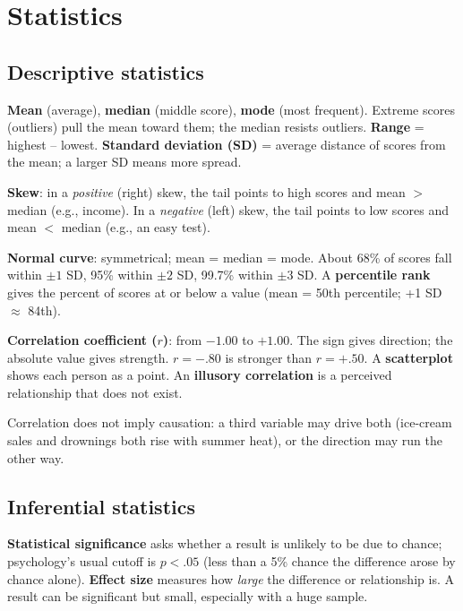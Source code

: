 \documentclass[11pt]{article}
\begin{document}
\section{Statistics}

\subsection{Descriptive statistics}
\textbf{Mean} (average), \textbf{median} (middle score), \textbf{mode} (most frequent). Extreme scores (outliers) pull the mean toward them; the median resists outliers.
\textbf{Range} = highest -- lowest. \textbf{Standard deviation (SD)} = average distance of scores from the mean; a larger SD means more spread.

\textbf{Skew}: in a \emph{positive} (right) skew, the tail points to high scores and mean \(>\) median (e.g., income). In a \emph{negative} (left) skew, the tail points to low scores and mean \(<\) median (e.g., an easy test).

\textbf{Normal curve}: symmetrical; mean = median = mode. About 68\% of scores fall within \(\pm1\) SD, 95\% within \(\pm2\) SD, 99.7\% within \(\pm3\) SD. A \textbf{percentile rank} gives the percent of scores at or below a value (mean = 50th percentile; +1 SD \(\approx\) 84th).

\textbf{Correlation coefficient (\(r\))}: from \(-1.00\) to \(+1.00\). The sign gives direction; the absolute value gives strength. \(r = -.80\) is stronger than \(r = +.50\). A \textbf{scatterplot} shows each person as a point. An \textbf{illusory correlation} is a perceived relationship that does not exist.

\begin{trap}
Correlation does not imply causation: a third variable may drive both (ice-cream sales and drownings both rise with summer heat), or the direction may run the other way.
\end{trap}

\subsection{Inferential statistics}
\textbf{Statistical significance} asks whether a result is unlikely to be due to chance; psychology's usual cutoff is \(p < .05\) (less than a 5\% chance the difference arose by chance alone). \textbf{Effect size} measures how \emph{large} the difference or relationship is. A result can be significant but small, especially with a huge sample.
\end{document}
